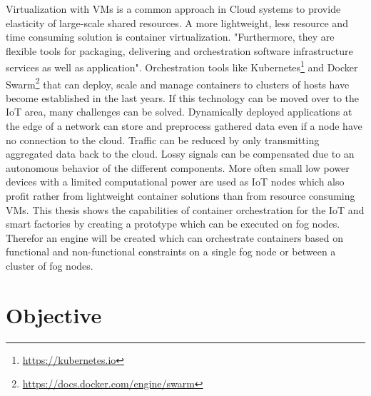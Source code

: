 Virtualization with \acp{VM} is a common approach in Cloud systems to provide elasticity of large-scale shared resources.\autocite[cf.][p. 117]{Pahl:2016}
A more lightweight, less resource and time consuming solution is container virtualization.
"Furthermore, they are flexible tools for packaging, delivering and orchestration software infrastructure services as well as application"\autocite[p. 117]{Pahl:2016}.
Orchestration tools like Kubernetes\footnote{\url{https://kubernetes.io}} and Docker Swarm\footnote{\url{https://docs.docker.com/engine/swarm}} that can deploy, scale and manage containers to clusters of hosts have become established in the last years.
If this technology can be moved over to the \ac{IoT} area, many challenges can be solved.
Dynamically deployed applications at the edge of a network can store and preprocess gathered data even if a node have no connection to the cloud.
Traffic can be reduced by only transmitting aggregated data back to the cloud.
Lossy signals can be compensated due to an autonomous behavior of the different components.
More often small low power devices with a limited computational power are used as \ac{IoT} nodes which also profit rather from lightweight container solutions than from resource consuming \acp{VM}.
This thesis shows the capabilities of container orchestration for the \ac{IoT} and smart factories by creating a prototype which can be executed on fog nodes.
Therefor an engine will be created which can orchestrate containers based on functional and non-functional constraints on a single fog node or between a cluster of fog nodes.


\section{Objective}



